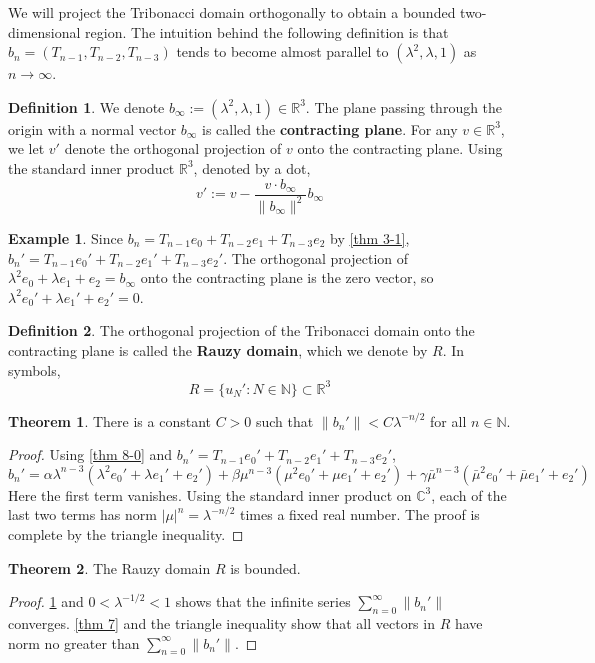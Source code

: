 \documentclass{article}
\theoremstyle{definition}
\newtheorem{theorem}{Theorem}
\newtheorem*{definition}{Definition}
\newtheorem*{example}{Example}
\begin{document}
We will project the Tribonacci domain orthogonally to obtain a bounded two-dimensional region. The intuition behind the following definition is that 
\(
b_n=(T_{n-1}, T_{n-2}, T_{n-3})
\)
tends to become almost parallel to $(\lambda^2, \lambda, 1)$ as $n\rightarrow \infty$.

\begin{definition}
We denote $b_\infty:=(\lambda^2, \lambda, 1)\in \mathbb{R}^3$. The plane passing through the origin with a normal vector $b_\infty$ is called the \textbf{contracting plane}. For any $v\in \mathbb{R}^3$, we let $v'$ denote the orthogonal projection of $v$ onto the contracting plane. Using the standard inner product $\mathbb{R}^3$, denoted by a dot, \[v':=v-\frac{v\cdot b_\infty}{\|b_\infty \|^2}b_\infty\] 
\end{definition}

\begin{example}
Since $b_n=T_{n-1}e_0+T_{n-2}e_1+T_{n-3}e_2$ by \cref{thm 3-1}, $b_n'=T_{n-1}e_0'+T_{n-2}e_1'+T_{n-3}e_2'$. The orthogonal projection of $\lambda^2e_0+\lambda e_1+e_2=b_\infty$ onto the contracting plane is the zero vector, so $\lambda^2e_0'+\lambda e_1'+e_2'=0$.
\end{example}

\begin{definition}
    The orthogonal projection of the Tribonacci domain onto the contracting plane is called the \textbf{Rauzy domain}, which we denote by $R$. In symbols, \[R=\{u_N':N\in \mathbb{N}\}\subset \mathbb{R}^3\]
\end{definition}



\begin{theorem}
    \label{thm 8}
    There is a constant $C>0$ such that $\|b_n' \|<C\lambda^{-n/2}$ for all $n\in \mathbb{N}$.
\end{theorem}
\begin{proof}
Using \cref{thm 8-0} and $b_n'=T_{n-1}e_0'+T_{n-2}e_1'+T_{n-3}e_2'$,
\[
b_n'=\alpha\lambda^{n-3}(\lambda^2e_0'+\lambda e_1'+e_2') + \beta\mu^{n-3}(\mu^2e_0'+\mu e_1'+e_2')+\gamma\bar{\mu}^{n-3}(\bar{\mu}^2e_0'+\bar{\mu} e_1'+e_2')
\]
Here the first term vanishes. Using the standard inner product on $\mathbb{C}^3$, each of the last two terms has norm $|\mu|^{n}=\lambda^{-n/2}$ times a fixed real number. The proof is complete by the triangle inequality.
\end{proof}

\begin{theorem}
\label{thm 9}
    The Rauzy domain $R$ is bounded.
\end{theorem}
\begin{proof}
\cref{thm 8} and $0<\lambda^{-1/2}<1$ shows that the infinite series \(\sum_{n=0}^\infty \|b_n'\| \) converges. \cref{thm 7} and the triangle inequality show that all vectors in $R$ have norm no greater than \(\sum_{n=0}^\infty \|b_n'\| \).
\end{proof}
\end{document}
